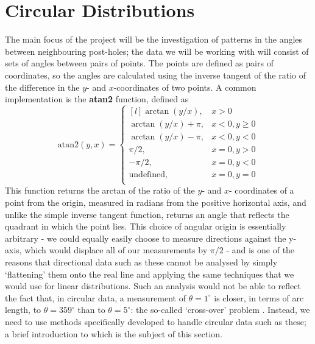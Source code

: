 \documentclass[../../ArchStats.tex]{subfiles}
\begin{document}




\section{Circular Distributions}

The main focus of the project will be the investigation of patterns in the angles between neighbouring post-holes; the data we will be working with will consist of sets of angles between pairs of points. The points are defined as pairs of coordinates, so the angles are calculated using the inverse tangent of the ratio of the difference in the $y$- and $x$-coordinates of two points. A common implementation is the \textbf{atan2} function, defined as
\begin{equation*}
\text{atan2} (y, x) = \left\lbrace \begin{matrix*}[l]
\arctan(y/x), & x > 0 \\
\arctan(y/x) + \pi, & x < 0, y \geq 0 \\
\arctan(y/x) - \pi, & x < 0, y < 0 \\
\pi/2, & x = 0, y > 0 \\
-\pi/2, & x = 0, y < 0 \\
\text{undefined}, & x = 0, y = 0 \\
\end{matrix*} \right. 
\end{equation*}
This function returns the arctan of the ratio of the $y$- and $x$- coordinates of a point from the origin, measured in radians from the positive horizontal axis, and unlike the simple inverse tangent function, returns an angle that reflects the quadrant in which the point lies. This choice of angular origin is essentially arbitrary - we could equally easily choose to measure directions against the y-axis, which would displace all of our measurements by $\pi/2$ - and is one of the reasons that directional  data such as these cannot be analysed by simply `flattening' them onto the real line and applying the same techniques that we would use for linear distributions. Such an analysis would not be able to reflect the fact that, in circular data, a measurement of $\theta = 1^\circ$ is closer, in terms of arc length, to $\theta = 359^\circ$ than to $\theta = 5^\circ$: the so-called `cross-over' problem \cite{Fisher1993}. Instead, we need to use methods specifically developed to handle circular data such as these; a brief introduction to which is the subject of this section. 
\end{document}
